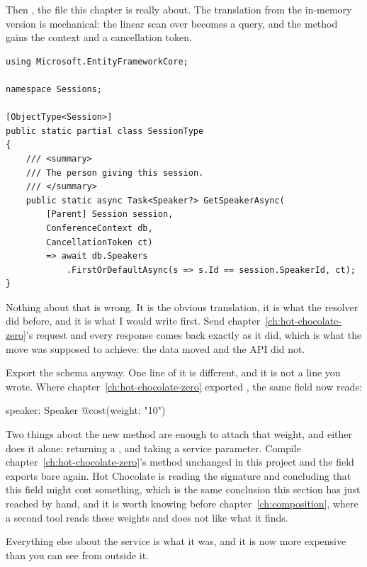 %
Then , the file this chapter is really about. The
translation from the in-memory version is mechanical: the linear scan over
 becomes a query, and the method gains the
context and a cancellation token.

\begin{verbatim}
using Microsoft.EntityFrameworkCore;

namespace Sessions;

[ObjectType<Session>]
public static partial class SessionType
{
    /// <summary>
    /// The person giving this session.
    /// </summary>
    public static async Task<Speaker?> GetSpeakerAsync(
        [Parent] Session session,
        ConferenceContext db,
        CancellationToken ct)
        => await db.Speakers
            .FirstOrDefaultAsync(s => s.Id == session.SpeakerId, ct);
}
\end{verbatim}

Nothing about that is wrong. It is the obvious translation, it is what the
resolver did before, and it is what I would write first. Send
chapter~\ref{ch:hot-chocolate-zero}'s request and every response comes back
exactly as it did, which is what the move was supposed to achieve: the data
moved and the API did not.

%
Export the schema anyway. One line of it is different, and it is not a line you
wrote. Where chapter~\ref{ch:hot-chocolate-zero} exported , the same field now reads:

\begin{graphqlsdl}
speaker: Speaker @cost(weight: "10")
\end{graphqlsdl}

Two things about the new method are enough to attach that weight, and either
does it alone: returning a , and taking a service parameter.
Compile chapter~\ref{ch:hot-chocolate-zero}'s method unchanged in this project
and the field exports bare again. Hot Chocolate is reading the signature and
concluding that this field might cost something, which is the same conclusion
this section has just reached by hand, and it is worth knowing before
chapter~\ref{ch:composition}, where a second tool reads these weights and does
not like what it finds.

Everything else about the service is what it was, and it is now more expensive
than you can see from outside it.

